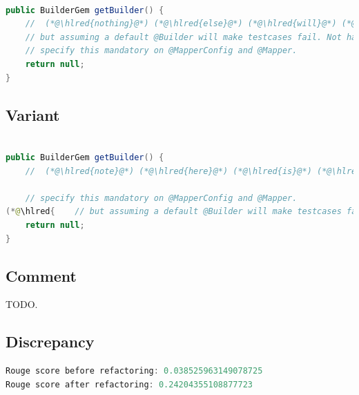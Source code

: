 \documentclass[usenames,dvipsnames]{article} %
\DeclareRobustCommand{\hlred}[1]{{\sethlcolor{pink}\hl{#1}}}
\begin{document}
  \begin{lstlisting}[language=java]

public BuilderGem getBuilder() {
    //  (*@\hlred{nothing}@*) (*@\hlred{else}@*) (*@\hlred{will}@*) (*@\hlred{do}@*) it (*@\hlred{automatically}@*)
    // but assuming a default @Builder will make testcases fail. Not having a default means that you need to
    // specify this mandatory on @MapperConfig and @Mapper.
    return null;
}
  \end{lstlisting}

  \subsection{Variant}

  \begin{lstlisting}[language=java]

public BuilderGem getBuilder() {
    //  (*@\hlred{note}@*) (*@\hlred{here}@*) (*@\hlred{is}@*) (*@\hlred{that}@*) (*@\hlred{developers}@*) (*@\hlred{could}@*) (*@\hlred{instead}@*) (*@\hlred{have}@*) (*@\hlred{more}@*) (*@\hlred{information}@*) (*@\hlred{that}@*) (*@\hlred{should}@*) (*@\hlred{not}@*) (*@\hlred{need}@*) (*@\hlred{builder}@*) (*@\hlred{information}@*) (*@\hlred{and}@*) (*@\hlred{should}@*) (*@\hlred{also}@*)

    // specify this mandatory on @MapperConfig and @Mapper.
(*@\hlred{    // but assuming a default @Builder will make testcases fail. Not having a default means that you need to}@*)
    return null;
}
  \end{lstlisting}

  \subsection{Comment}

  TODO.

  \subsection{Discrepancy}

  \begin{lstlisting}[language=java]
Rouge score before refactoring: 0.038525963149078725
Rouge score after refactoring: 0.24204355108877723
  \end{lstlisting}

\end{document}
